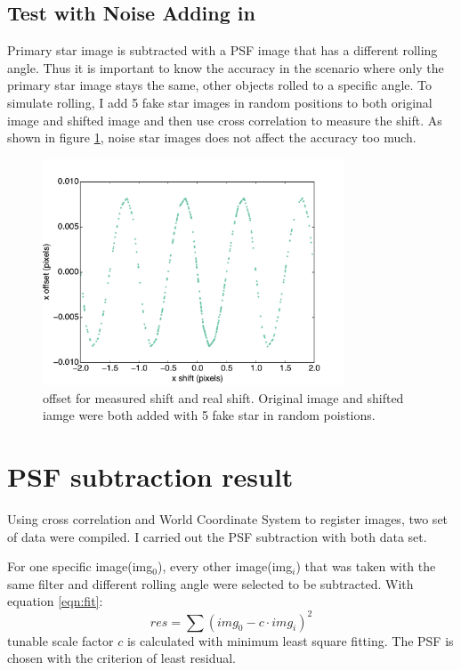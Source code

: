 \documentclass[paper=letter, fontsize=11pt]{scrartcl} %
\numberwithin{equation}{section} %
\numberwithin{figure}{section} %
\numberwithin{table}{section} %
\begin{document}
\subsection{Test with Noise Adding in}
Primary star image is subtracted with a PSF image that has a different
rolling angle. Thus it is important to know the accuracy in the
scenario  where only the primary star image stays the same, other
objects rolled to a specific angle. To simulate rolling, I add 5 fake
star images in random positions to both original image and shifted
image and then use cross correlation to measure the shift. As shown in
figure \ref{fig:shift2}, noise star images does not affect the
accuracy too much.

\begin{figure}[h]
      \centering
      \includegraphics[width=0.8\textwidth]{crosscorr_cenWithNoise}
      \caption{offset for measured shift and real shift. Original
        image and shifted iamge were both added with 5 fake star in
        random poistions.}
      \label{fig:shift2}
    \end{figure}

 \section{PSF subtraction result}
Using cross correlation and  World Coordinate System to register
images, two set of data were compiled. I carried out the PSF
subtraction with both data set.\par

For one specific image(img$_{0}$), every other image(img$_{i}$) that was taken with the same
filter and different rolling angle were selected to be
subtracted. With equation \ref{eqn:fit}:
\begin{equation}
  \label{eqn:fit}
  res = \sum(img_{0} - c\cdot img_{i})^{2}
\end{equation}
tunable scale factor $c$ is calculated with minimum least square
fitting. The PSF is chosen with the criterion of least residual. \par
\end{document}
